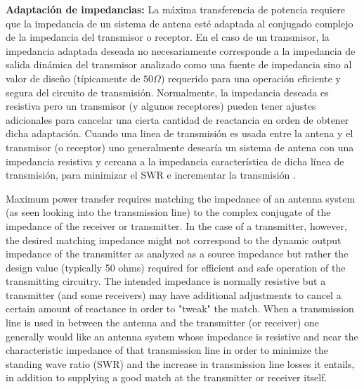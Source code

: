 {\textbf{Adaptación de impedancias:}} La máxima transferencia de potencia requiere que la impedancia de un sistema de 
antena esté adaptada al conjugado complejo de la impedancia del transmisor o receptor. En el caso de un transmisor, 
la impedancia adaptada deseada no necesariamente corresponde a la impedancia de salida dinámica del transmisor analizado
como una fuente de impedancia sino al valor de diseño (típicamente de $50 \Omega$) requerido para una operación eficiente
y segura del circuito de transmisión. Normalmente, la impedancia deseada es resistiva pero un transmisor (y algunos receptores)
pueden tener ajustes adicionales para cancelar una cierta cantidad de reactancia en orden de obtener dicha adaptación. Cuando
una linea de transmisión es usada entre la antena y el transmisor (o receptor) uno generalmente desearía un sistema de antena
con una impedancia resistiva y cercana a la impedancia característica de dicha línea de transmisión, para minimizar el SWR 
e incrementar la transmisión \cite{AntennaWiki}. 


Maximum power transfer requires matching the impedance of an antenna system (as seen looking into the transmission line) to the complex conjugate of the impedance of the receiver or transmitter. In the case of a transmitter, however, the desired matching impedance might not correspond to the dynamic output impedance of the transmitter as analyzed as a source impedance but rather the design value (typically 50 ohms) required for efficient and safe operation of the transmitting circuitry. The intended impedance is normally resistive but a transmitter (and some receivers) may have additional adjustments to cancel a certain amount of reactance in order to "tweak" the match. When a transmission line is used in between the antenna and the transmitter (or receiver) one generally would like an antenna system whose impedance is resistive and near the characteristic impedance of that transmission line in order to minimize the standing wave ratio (SWR) and the increase in transmission line losses it entails, in addition to supplying a good match at the transmitter or receiver itself.



